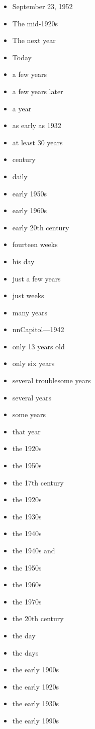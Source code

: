 \documentclass[12pt,a4paper]{article}
\begin{document}
\begin{itemize}
  \item September 23, 1952
  \item The mid-1920s
  \item The next year
  \item Today
  \item a few years
  \item a few years later
  \item a year
  \item as early as 1932
  \item at least 30 years
  \item century
  \item daily
  \item early 1950s
  \item early 1960s
  \item early 20th century
  \item fourteen weeks
  \item his day
  \item just a few years
  \item just weeks
  \item many years
  \item nnCapitol---1942
  \item only 13 years old
  \item only six years
  \item several troublesome years
  \item several years
  \item some years
  \item that year
  \item the  1920s
  \item the 1950s
  \item the 17th century
  \item the 1920s
  \item the 1930s
  \item the 1940s
  \item the 1940s and
  \item the 1950s
  \item the 1960s
  \item the 1970s
  \item the 20th century
  \item the day
  \item the days
  \item the early 1900s
  \item the early 1920s
  \item the early 1930s
  \item the early 1990s

\end{itemize}
\end{document}
